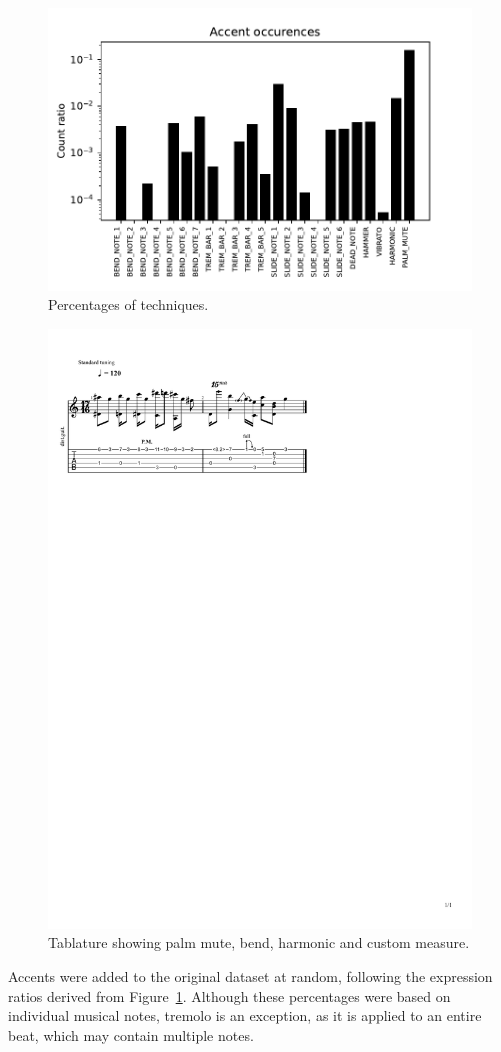 \documentclass[twoside,11pt]{article}
\begin{document}
\begin{figure}[H]
\centering
\includegraphics[clip, width=0.91\linewidth]{accent_probability.pdf}
\caption{Percentages of techniques.}
\label{fig:accent}
\end{figure}

\begin{figure}[H]
\centering
\includegraphics[trim={20 620 200 100}, clip, width=0.8\linewidth]{outputexample.pdf}
\caption{Tablature showing palm mute, bend, harmonic and custom measure.}
\label{fig:gpro}
\end{figure}
Accents were added to the original dataset at random, 
following the expression ratios derived from 
Figure~\ref{fig:accent}. Although these percentages were 
based on individual musical notes, tremolo is an exception, 
as it is applied to an entire beat, which may contain multiple 
notes.
\end{document}

